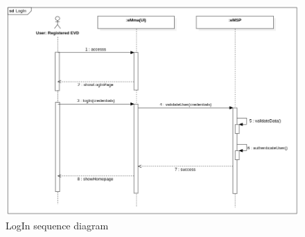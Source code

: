 \begin{figure}[H]
    \centering
    \includegraphics[width=1\textwidth]{Images/cp3/LogInSD.png}
    \caption{LogIn sequence diagram}
\end{figure}

